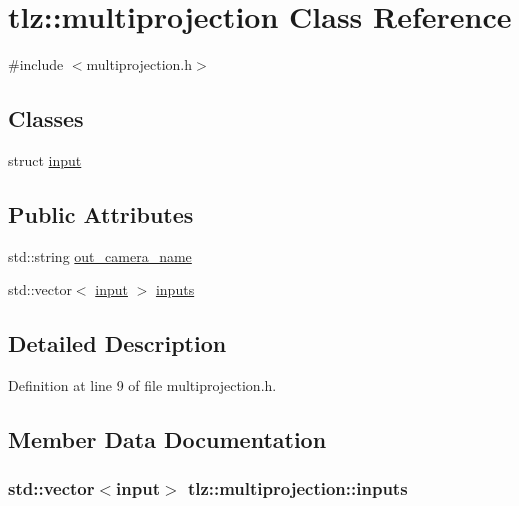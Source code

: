 \hypertarget{classtlz_1_1multiprojection}{}\section{tlz\+:\+:multiprojection Class Reference}
\label{classtlz_1_1multiprojection}


{\ttfamily \#include $<$multiprojection.\+h$>$}

\subsection*{Classes}
\begin{DoxyCompactItemize}
\item 
struct \hyperlink{structtlz_1_1multiprojection_1_1input}{input}
\end{DoxyCompactItemize}
\subsection*{Public Attributes}
\begin{DoxyCompactItemize}
\item 
std\+::string \hyperlink{classtlz_1_1multiprojection_ab6ed1594110a2839d5ed43191f695db0}{out\+\_\+camera\+\_\+name}
\item 
std\+::vector$<$ \hyperlink{structtlz_1_1multiprojection_1_1input}{input} $>$ \hyperlink{classtlz_1_1multiprojection_a5ea9619286abef10f8fbe2f861ba0c3d}{inputs}
\end{DoxyCompactItemize}


\subsection{Detailed Description}


Definition at line 9 of file multiprojection.\+h.



\subsection{Member Data Documentation}
\subsubsection[{\texorpdfstring{inputs}{inputs}}]{\setlength{\rightskip}{0pt plus 5cm}std\+::vector$<${\bf input}$>$ tlz\+::multiprojection\+::inputs}\hypertarget{classtlz_1_1multiprojection_a5ea9619286abef10f8fbe2f861ba0c3d}{}\label{classtlz_1_1multiprojection_a5ea9619286abef10f8fbe2f861ba0c3d}


